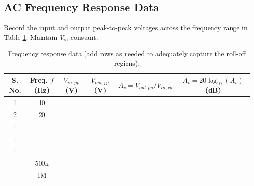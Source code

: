 \subsection{AC Frequency Response Data}
Record the input and output peak-to-peak voltages across the frequency range in Table \ref{tab:freq_response_obs}. Maintain $V_{in}$ constant.
\begin{table}[h!]
	\centering
	\begin{tabular}{@{}cccccc@{}}
		\toprule
		S. No. & Freq. $f$ (Hz) & $V_{in,pp}$ (V) & $V_{out,pp}$ (V) & $A_v = V_{out,pp}/V_{in,pp}$ & $A_v = 20\log_{10}(A_v)$ (dB) \\
		\midrule
		1& 10	&  &  &  &  \\
		2& 20	&  &  &  &  \\
		$\vdots$ & $\vdots$	&  &  &  &  \\
		$\vdots$&$\vdots$	&  &  &  &  \\
		$\vdots$&$\vdots$	&  &  &  &  \\
		& 500k	&  &  &  &  \\
		& 1M	&  &  &  &  \\
		\bottomrule
	\end{tabular}
	\caption{Frequency response data (add rows as needed to adequately capture the roll-off regions).}
	\label{tab:freq_response_obs}
\end{table}
\newpage
